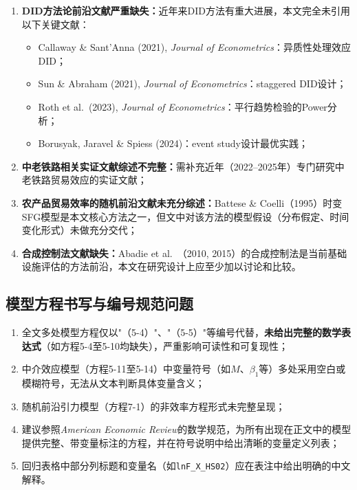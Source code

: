 \documentclass[12pt, a4paper]{article}
\begin{document}
\begin{minorbox}

\begin{enumerate}[label=\arabic*)]
  \item \textbf{DID方法论前沿文献严重缺失：}近年来DID方法有重大进展，本文完全未引用以下关键文献：
    \begin{itemize}
      \item Callaway \& Sant'Anna (2021), \textit{Journal of Econometrics}：异质性处理效应DID；
      \item Sun \& Abraham (2021), \textit{Journal of Econometrics}：staggered DID设计；
      \item Roth et al.\ (2023), \textit{Journal of Econometrics}：平行趋势检验的Power分析；
      \item Borusyak, Jaravel \& Spiess (2024)：event study设计最优实践；
    \end{itemize}

  \item \textbf{中老铁路相关实证文献综述不完整：}需补充近年（2022--2025年）专门研究中老铁路贸易效应的实证文献；

  \item \textbf{农产品贸易效率的随机前沿文献未充分综述：}Battese \& Coelli（1995）时变SFG模型是本文核心方法之一，但文中对该方法的模型假设（分布假定、时间变化形式）未做充分交代；

  \item \textbf{合成控制法文献缺失：}Abadie et al.\ （2010, 2015）的合成控制法是当前基础设施评估的方法前沿，本文在研究设计上应至少加以讨论和比较。
\end{enumerate}
\end{minorbox}

\subsection{模型方程书写与编号规范问题}
\label{sec:equations}

\begin{minorbox}

\begin{enumerate}[label=\arabic*)]
  \item 全文多处模型方程仅以"（5-4）"、"（5-5）"等编号代替，\textbf{未给出完整的数学表达式}（如方程5-4至5-10均缺失），严重影响可读性和可复现性；
  \item 中介效应模型（方程5-11至5-14）中变量符号（如$M$、$\beta_1$等）多处采用空白或模糊符号，无法从文本判断具体变量含义；
  \item 随机前沿引力模型（方程7-1）的非效率方程形式未完整呈现；
  \item 建议参照\textit{American Economic Review}的数学规范，为所有出现在正文中的模型提供完整、带变量标注的方程，并在符号说明中给出清晰的变量定义列表；
  \item 回归表格中部分列标题和变量名（如\texttt{lnF\_X\_HS02}）应在表注中给出明确的中文解释。
\end{enumerate}
\end{minorbox}
\end{document}
